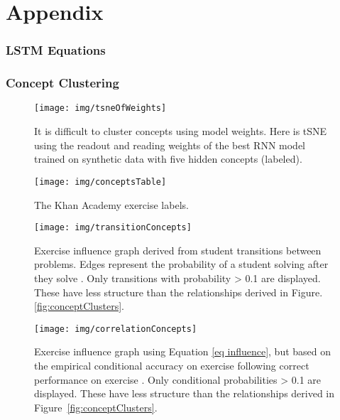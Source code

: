 \documentclass{article} \usepackage{nips,times}
\begin{document}
\small





\newpage
\normalsize
\appendix
\part*{Appendix}

\setcounter{figure}{0} \renewcommand{\thefigure}{A.\arabic{figure}}
\setcounter{table}{0} \renewcommand{\thetable}{A.\arabic{table}}

\section{LSTM Equations}
\label{app LSTM}


\section{Concept Clustering}


\begin{figure}[h]
\centering
\texttt{[image: img/tsneOfWeights]}
\caption{It is difficult to cluster concepts using model weights. Here is tSNE using the readout and reading weights of the best RNN model trained on synthetic data with five hidden concepts (labeled).
\label{fig:tsneWeights}
}
\end{figure}

\begin{figure}[h]
\centering
\texttt{[image: img/conceptsTable]}
\caption{The Khan Academy exercise labels.
\label{fig:conceptsTable2}
}
\end{figure}

\begin{figure}[h]
\centering
\texttt{[image: img/transitionConcepts]}
\caption{Exercise influence graph derived from student transitions between problems. Edges  represent the probability of a student solving  after they solve . Only transitions with probability > 0.1 are displayed. These have less structure than the relationships derived in Figure.
\ref{fig:conceptClusters}.
\label{fig:transitionConcepts}
}
\end{figure}

\begin{figure}[h]
\centering
\texttt{[image: img/correlationConcepts]}
\caption{Exercise influence graph using Equation \ref{eq influence}, but based on the empirical conditional accuracy on exercise  following correct performance on exercise . Only conditional probabilities > 0.1 are displayed.
These have less structure than the relationships derived in Figure~\ref{fig:conceptClusters}.
\label{fig:correlationConcepts}
}
\end{figure}
\end{document}
